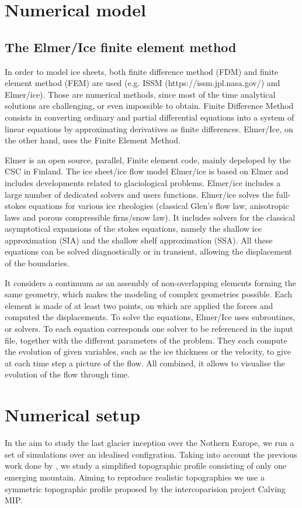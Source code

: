 \documentclass[a4paper,12pt]{article}
\begin{document}
\section{Numerical model}
\subsection{The Elmer/Ice finite element method}
In order to model ice sheets, both finite difference method (FDM) and finite element method (FEM) are used (e.g. ISSM (https://issm.jpl.nasa.gov/) and Elmer/ice). Those are numerical methods, since most of the time analytical solutions are challenging, or even impossible to obtain. Finite Difference Method consists in converting ordinary and partial differential equations into a system of linear equations by approximating derivatives as finite differences. Elmer/Ice, on the other hand, uses the Finite Element Method.

Elmer is an open source, parallel, Finite element code, mainly depeloped by the CSC in Finland. The ice sheet/ice flow model Elmer/ice is based on Elmer and includes developments related to glaciological problems. Elmer/ice includes a large number of dedicated solvers and users functions.
Elmer/ice solves the full-stokes equations for various ice rheologies (classical  Glen's flow law, anisotropic laws and porous compressible firns/snow law). It includes solvers for the classical asymptotical expansions of the stokes equations, namely the shallow 	ice approximation (SIA) and the shallow shelf approximation (SSA). All these equations can be solved diagnostically or in transient, allowing the displacement of the boundaries. 

It considers a continuum as an assembly of non-overlapping elements forming the same geometry, which makes the modeling of complex geometries possible. Each element is made of at least two points, on which are applied the forces and computed the displacements. To solve the equations, Elmer/Ice uses subroutines, or solvers. To each equation corresponds one solver to be referenced in the input file, together with the different parameters of the problem. They each compute the evolution of given variables, such as the ice thickness or the velocity, to give at each time step a picture of the flow. All combined, it allows to visualise the evolution of the flow through time.
\section{Numerical setup}
In the aim to study the last glacier inception over the Nothern Europe, we run a set of simulations over an idealised configration. Taking into account the previous work done by \cite{Dainche2022}, we study a simplified topographic profile consisting of only one emerging mountain. Aiming to reproduce realistic topographies we use a symmetric topographic profile proposed by the intercoparision project Calving MIP.
\end{document}
